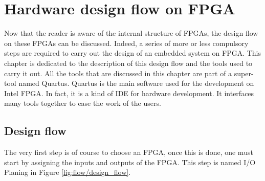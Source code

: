 \chapter{Hardware design flow on FPGA}

Now that the reader is aware of the internal structure of FPGAs, the design flow on these FPGAs can 
be discussed. Indeed, a series of more or less compulsory steps are required to carry out the 
design of an embedded system on FPGA. This chapter is dedicated to the description of this 
design flow and the tools used to carry it out. All the tools that are discussed in this chapter are
part of a super-tool named Quartus. Quartus is the main software used for the development on Intel 
FPGA. In fact, it is a kind of IDE for hardware development. It interfaces many tools together to
ease the work of the users.

\section{Design flow}

The very first step is of course to choose an FPGA, once this is done, one must start by assigning 
the inputs and outputs of the FPGA. This step is named I/O Planing in Figure \ref{fig:flow/design_flow}.

